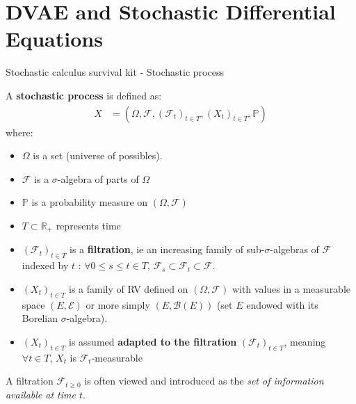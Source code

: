 \section{DVAE and Stochastic Differential Equations}\label{DVAEs and SDEs}


\begin{frame}{Stochastic calculus survival kit - Stochastic process}
    
\begin{definition}
    A \textbf{stochastic process} is defined as:
\begin{align}
    X &= (\Omega, \mathcal{F}, (\mathcal{F}_t)_{t \in T}, (X_t)_{t \in T}, \mathbb{P})
\end{align}
where:
    \begin{itemize}
        \item $\Omega$ is a set (universe of possibles).
        \item $\mathcal{F}$ is a $\sigma$-algebra of parts of $\Omega$
        \item $\mathbb{P}$ is a probability measure on $(\Omega, \mathcal{F})$
        \item $T \subset \mathbb{R}_+$ represents time
        \item $(\mathcal{F}_t)_{t \in T}$ is a \textbf{filtration}, ie an increasing family of sub-$\sigma$-algebras of $\mathcal{F}$ indexed by $t$ : $\forall 0 \leq s \leq t \in T$, $\mathcal{F}_s \subset \mathcal{F}_t \subset \mathcal{F}$.
        \item $(X_t)_{t \in T}$ is a family of RV defined on $(\Omega, \mathcal{F})$ with values in a measurable space $(E, \mathcal{E})$ or more simply $(E, \mathcal{B}(E))$ (set $E$ endowed with its Borelian $\sigma$-algebra).
        \item $(X_t)_{t \in T}$ is assumed \textbf{adapted to the filtration} $(\mathcal{F}_t)_{t \in T}$, meaning $\forall t \in T$, $X_t$ is $\mathcal{F}_t$-measurable
    \end{itemize}
\end{definition}

A filtration $\mathcal{F}_{t\geq 0}$ is often viewed and introduced as the \textit{set of information available at time $t$}. 

\end{frame}




